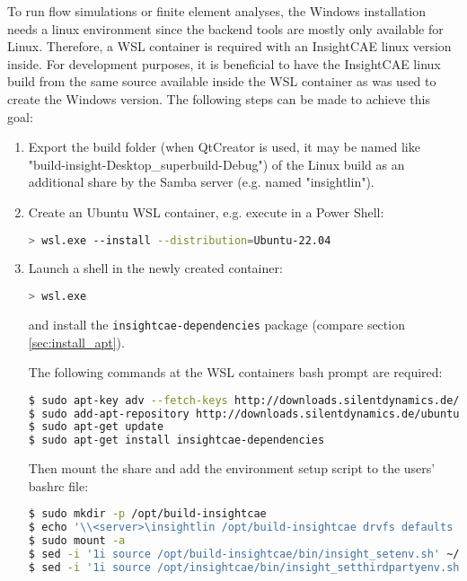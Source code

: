 To run flow simulations or finite element analyses, the Windows installation needs a linux environment since the backend tools are mostly only available for Linux.
Therefore, a WSL container is required with an InsightCAE linux version inside.
For development purposes, it is beneficial to have the InsightCAE linux build from the same source available inside the WSL container as was used to create the Windows version.
The following steps can be made to achieve this goal:
\begin{enumerate}
\item Export the build folder (when QtCreator is used, it may be named like "build-insight-Desktop\_superbuild-Debug") of the Linux build as an additional share by the Samba server (e.g. named "insightlin").
\item Create an Ubuntu WSL container, e.g. execute in a Power Shell:

\begin{lstlisting}[language=bash]
> wsl.exe --install --distribution=Ubuntu-22.04
\end{lstlisting}
\item Launch a shell in the newly created container:
\begin{lstlisting}[language=bash]
> wsl.exe
\end{lstlisting}
and install the \texttt{insightcae-dependencies} package (compare section \ref{sec:install_apt}).

The following commands at the WSL containers bash prompt are required:
\begin{lstlisting}[language=bash]
$ sudo apt-key adv --fetch-keys http://downloads.silentdynamics.de/SD_REPOSITORIES_PUBLIC_KEY.gpg
$ sudo add-apt-repository http://downloads.silentdynamics.de/ubuntu_dev
$ sudo apt-get update
$ sudo apt-get install insightcae-dependencies
\end{lstlisting}
Then mount the share and add the environment setup script to the users' bashrc file:
\begin{lstlisting}[language=bash]
$ sudo mkdir -p /opt/build-insightcae
$ echo '\\<server>\insightlin /opt/build-insightcae drvfs defaults 0 0' | sudo tee /etc/fstab
$ sudo mount -a
$ sed -i '1i source /opt/build-insightcae/bin/insight_setenv.sh' ~/.bashrc
$ sed -i '1i source /opt/insightcae/bin/insight_setthirdpartyenv.sh' ~/.bashrc
\end{lstlisting}

\end{enumerate}

